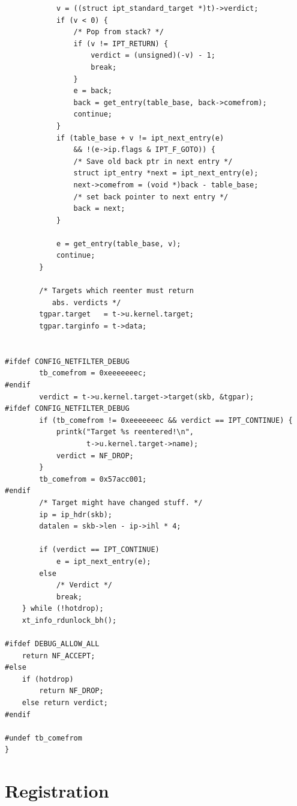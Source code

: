 \documentclass[a4paper,10pt]{article}
\begin{document}
\begin{lstlisting}
			v = ((struct ipt_standard_target *)t)->verdict;
			if (v < 0) {
				/* Pop from stack? */
				if (v != IPT_RETURN) {
					verdict = (unsigned)(-v) - 1;
					break;
				}
				e = back;
				back = get_entry(table_base, back->comefrom);
				continue;
			}
			if (table_base + v != ipt_next_entry(e)
			    && !(e->ip.flags & IPT_F_GOTO)) {
				/* Save old back ptr in next entry */
				struct ipt_entry *next = ipt_next_entry(e);
				next->comefrom = (void *)back - table_base;
				/* set back pointer to next entry */
				back = next;
			}

			e = get_entry(table_base, v);
			continue;
		}

		/* Targets which reenter must return
		   abs. verdicts */
		tgpar.target   = t->u.kernel.target;
		tgpar.targinfo = t->data;


#ifdef CONFIG_NETFILTER_DEBUG
		tb_comefrom = 0xeeeeeeec;
#endif
		verdict = t->u.kernel.target->target(skb, &tgpar);
#ifdef CONFIG_NETFILTER_DEBUG
		if (tb_comefrom != 0xeeeeeeec && verdict == IPT_CONTINUE) {
			printk("Target %s reentered!\n",
			       t->u.kernel.target->name);
			verdict = NF_DROP;
		}
		tb_comefrom = 0x57acc001;
#endif
		/* Target might have changed stuff. */
		ip = ip_hdr(skb);
		datalen = skb->len - ip->ihl * 4;

		if (verdict == IPT_CONTINUE)
			e = ipt_next_entry(e);
		else
			/* Verdict */
			break;
	} while (!hotdrop);
	xt_info_rdunlock_bh();

#ifdef DEBUG_ALLOW_ALL
	return NF_ACCEPT;
#else
	if (hotdrop)
		return NF_DROP;
	else return verdict;
#endif

#undef tb_comefrom
}
\end{lstlisting}

\section{Registration}


\end{document}
